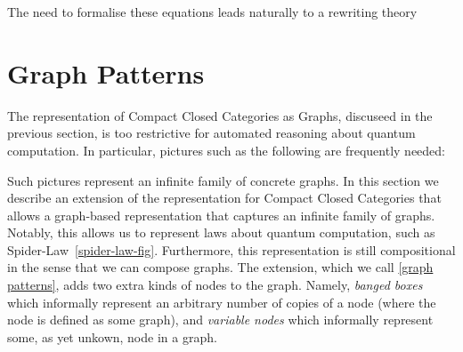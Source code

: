 \documentclass[runningheads]{llncs}
\begin{document}
The need to formalise these equations leads naturally to a rewriting
theory 

\section{Graph Patterns}
\label{sec:patterns}

The representation of Compact Closed Categories as Graphs, discuseed
in the previous section, is too restrictive for automated reasoning
about quantum computation. In particular, pictures such as the
following are frequently needed:

\begin{center}
\end{center}

\noindent Such pictures represent an infinite family of concrete
graphs. In this section we describe an extension of the representation
for Compact Closed Categories that allows a graph-based representation
that captures an infinite family of graphs. Notably, this allows us to
represent laws about quantum computation, such as
Spider-Law~\ref{spider-law-fig}. Furthermore, this representation is
still compositional in the sense that we can compose graphs. The
extension, which we call \ref{graph patterns}, adds two extra kinds of
nodes to the graph. Namely, {\em banged boxes} which informally
represent an arbitrary number of copies of a node (where the node is
defined as some graph), and {\em variable nodes} which informally
represent some, as yet unkown, node in a graph.
\end{document}
